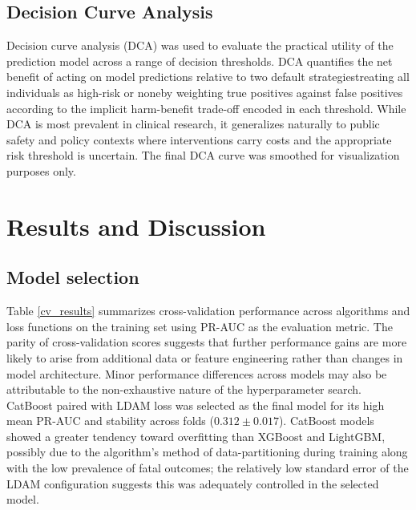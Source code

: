 \documentclass{article}
\begin{document}
\subsection{Decision Curve Analysis}
Decision curve analysis (DCA) was used to evaluate the practical utility of the prediction model across a range of decision thresholds.\cite{Vickers2006-ok} DCA quantifies the net benefit of acting on model predictions relative to two default strategies\textemdash treating all individuals as high-risk or none\textemdash by weighting true positives against false positives according to the implicit harm-benefit trade-off encoded in each threshold. While DCA is most prevalent in clinical research, it generalizes naturally to public safety and policy contexts where interventions carry costs and the appropriate risk threshold is uncertain. The final DCA curve was smoothed for visualization purposes only.



\section{Results and Discussion}
\label{sec:Results}
\subsection{Model selection}
Table \ref{cv_results} summarizes cross-validation performance across algorithms and loss functions on the training set using PR-AUC as the evaluation metric. The parity of cross-validation scores suggests that further performance gains are more likely to arise from additional data or feature engineering rather than changes in model architecture. Minor performance differences across models may also be attributable to the non-exhaustive nature of the hyperparameter search. CatBoost paired with LDAM loss was selected as the final model for its high mean PR-AUC and stability across folds ($0.312 \pm 0.017$). CatBoost models showed a greater tendency toward overfitting than XGBoost and LightGBM, possibly due to the algorithm’s method of data-partitioning during training along with the low prevalence of fatal outcomes; the relatively low standard error of the LDAM configuration suggests this was adequately controlled in the selected model.
\end{document}
